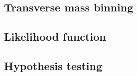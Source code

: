 

\subsection{Transverse mass binning}
\label{sec:stat:mt_bin}



\subsection{Likelihood function}
\label{sec:stat:likelihood}



\subsection{Hypothesis testing}
\label{sec:stat:tests}

